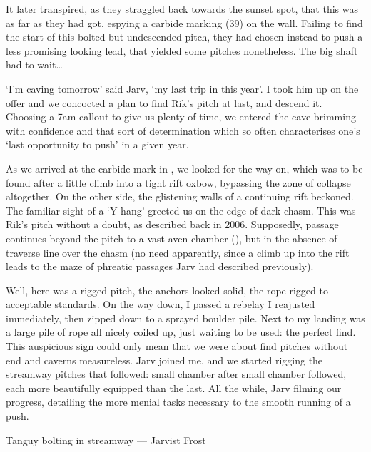 It later transpired, as they straggled back towards the sunset spot, that this was as far as they had got,  espying a carbide marking (39) on the wall. Failing to find the start of this bolted but undescended pitch, they had chosen instead to push a less promising looking lead, that yielded some pitches nonetheless. The big shaft had to wait…

`I'm caving tomorrow' said Jarv, `my last trip in  this year'. I took him up on the offer and we concocted a plan to find Rik's pitch at last, and descend it. Choosing a 7am callout to give us plenty of time, we entered the cave brimming with confidence and that sort of determination which so often characterises one's `last opportunity to push' in a given year. 

As we arrived at the carbide mark in , we looked for the way on, which was to be found after a little climb into a tight rift oxbow, bypassing the zone of collapse altogether. On the other side, the glistening walls of a continuing rift beckoned. The familiar sight of a `Y-hang' greeted us on the edge of dark chasm. This was Rik's pitch without a doubt, as described back in 2006. Supposedly,  passage continues beyond the pitch to a vast aven chamber (), but in the absence of traverse line over the chasm (no need apparently, since a climb up into the rift leads to the maze of phreatic passages Jarv had described previously).


Well, here was a rigged pitch, the anchors looked solid, the rope rigged to acceptable standards. On the way down, I passed a rebelay I reajusted immediately, then zipped down to a sprayed boulder pile. Next to my landing was a large pile of rope all nicely coiled up, just waiting to be used: the perfect find. This auspicious sign could only mean that we were about find pitches without end and caverns measureless. Jarv joined me, and we started rigging the streamway pitches that followed: small chamber after small chamber followed, each more beautifully equipped than the last. All the while, Jarv filming our progress, detailing the more menial tasks necessary to the smooth running of  a push.

\begin{marginfigure}
\centering
{}
\label{tanguybolting}
\caption{ Tanguy bolting in \protect{} streamway --- Jarvist Frost}
\end{marginfigure}

